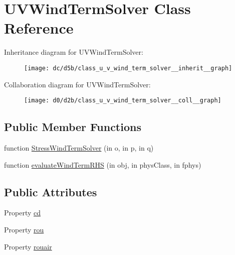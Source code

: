 \hypertarget{class_u_v_wind_term_solver}{}\section{U\+V\+Wind\+Term\+Solver Class Reference}
\label{class_u_v_wind_term_solver}


Inheritance diagram for U\+V\+Wind\+Term\+Solver\+:
\nopagebreak
\begin{figure}[H]
\begin{center}
\leavevmode
\texttt{[image: dc/d5b/class\_u\_v\_wind\_term\_solver\_\_inherit\_\_graph]}
\end{center}
\end{figure}


Collaboration diagram for U\+V\+Wind\+Term\+Solver\+:
\nopagebreak
\begin{figure}[H]
\begin{center}
\leavevmode
\texttt{[image: d0/d2b/class\_u\_v\_wind\_term\_solver\_\_coll\_\_graph]}
\end{center}
\end{figure}
\subsection*{Public Member Functions}
\begin{DoxyCompactItemize}
\item 
function \hyperlink{class_u_v_wind_term_solver_ab6c6d165b83848574b4151676d10e330}{Stress\+Wind\+Term\+Solver} (in o, in p, in q)
\item 
function \hyperlink{class_u_v_wind_term_solver_aa677bdadee17c65f60b39004385c0448}{evaluate\+Wind\+Term\+R\+HS} (in obj, in phys\+Class, in fphys)
\end{DoxyCompactItemize}
\subsection*{Public Attributes}
\begin{DoxyCompactItemize}
\item 
Property \hyperlink{class_u_v_wind_term_solver_add16ce844ccf533da7bde7ede417f111}{cd}
\item 
Property \hyperlink{class_u_v_wind_term_solver_aa94471ce04a95f8daf4d514a581f4fd4}{rou}
\item 
Property \hyperlink{class_u_v_wind_term_solver_aff0dfee0d18fb32e8a21e63f96fb1cc4}{rouair}
\end{DoxyCompactItemize}


